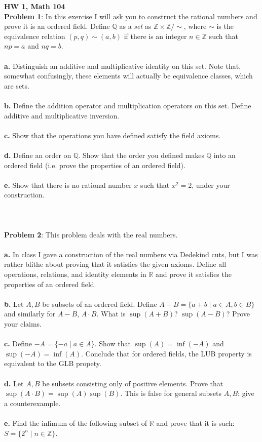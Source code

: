 \documentclass[UTF8,11pt]{article}
\begin{document}
\textbf{HW 1, Math 104} \\

\noindent \textbf{Problem 1}: In this exercise I will ask you to construct the rational numbers and prove it is an ordered field. Define $\mathbb{Q}$ as a \emph{set} as $\mathbb{Z} \times \mathbb{Z}/\sim$, where $\sim$ is the equivalence relation $(p, q) \sim (a, b)$ if there is an integer $n \in \mathbb{Z}$ such that $np = a$ and $nq = b$. \\
\\
\textbf{a.} Distinguish an additive and multiplicative identity on this set.  Note that, somewhat confusingly, these elements will actually be equivalence classes, which are sets. \\
\\
\textbf{b.} Define the addition operator and multiplication operators on this set.  Define additive and multiplicative inversion. \\
\\
\textbf{c.} Show that the operations you have defined satisfy the field axioms. \\
\\
\textbf{d.} Define an order on $\mathbb{Q}$.  Show that the order you defined makes $\mathbb{Q}$ into an ordered field (i.e. prove the properties of an ordered field). \\
\\
\textbf{e.} Show that there is no rational number $x$ such that $x^2 = 2$, under your construction. \\
\\
\\
\\

\noindent \textbf{Problem 2}: This problem deals with the real numbers. \\
\\
\textbf{a.} In class I gave a construction of the real numbers via Dedekind cuts, but I was rather blithe about proving that it satisfies the given axioms. Define all operations, relations, and identity elements in $\mathbb{R}$ and prove it satisfies the properties of an ordered field. \\
\\
\textbf{b.} Let $A, B$ be subsets of an ordered field.  Define $A + B = \{a + b \mid a \in A, b \in B\}$ and similarly for $A - B$, $A \cdot B$.  What is $\sup(A + B)$?  $\sup(A - B)$?  Prove your claims. \\
\\
\textbf{c.} Define $-A = \{-a \mid a \in A\}$.  Show that $\sup(A) = \inf(-A)$ and $\sup(-A) = \inf(A)$.  Conclude that for ordered fields, the LUB property is equivalent to the GLB propety. \\
\\
\textbf{d.} Let $A, B$ be subsets consisting only of positive elements.  Prove that $\sup(A \cdot B) = \sup(A) \sup(B)$.  This is false for general subsets $A, B$: give a counterexample. \\
\\
\textbf{e.} Find the infimum of the following subset of $\mathbb{R}$ and prove that it is such: $S = \{ 2^{n} \mid n \in \mathbb{Z}\}$. \\
\end{document}
